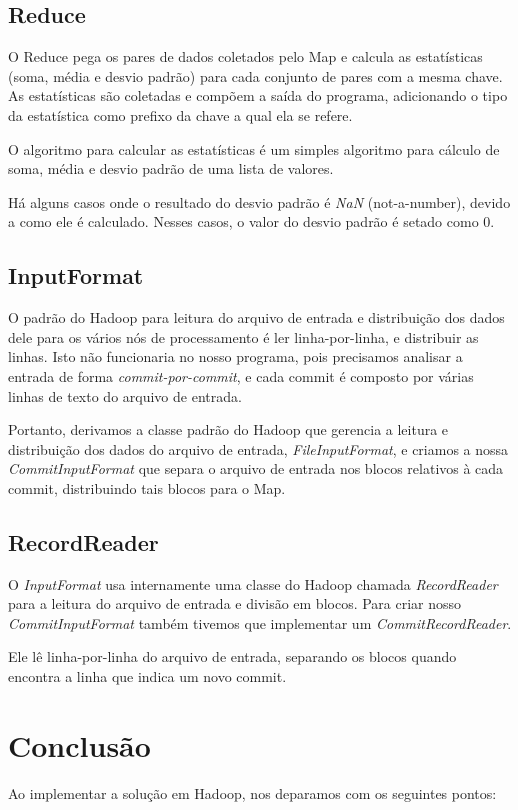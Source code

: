 \subsection{Reduce}
O Reduce pega os pares de dados coletados pelo Map e calcula as estatísticas (soma, média e desvio
padrão) para cada conjunto de pares com a mesma chave. As estatísticas são coletadas e compõem
a saída do programa, adicionando o tipo da estatística como prefixo da chave a qual ela se refere. 

O algoritmo para calcular as estatísticas é um simples algoritmo para cálculo de soma, média e
desvio padrão de uma lista de valores.

Há alguns casos onde o resultado do desvio padrão é \textit{NaN} (not-a-number), devido a como ele
é calculado. Nesses casos, o valor do desvio padrão é setado como 0.

\subsection{InputFormat}
O padrão do Hadoop para leitura do arquivo de entrada e distribuição dos dados dele para os vários
nós de processamento é ler linha-por-linha, e distribuir as linhas. Isto não funcionaria no nosso
programa, pois precisamos analisar a entrada de forma \textit{commit-por-commit}, e cada commit
é composto por várias linhas de texto do arquivo de entrada.

Portanto, derivamos a classe padrão do Hadoop que gerencia a leitura e distribuição dos dados do
arquivo de entrada, \textit{FileInputFormat}, e criamos a nossa \textit{CommitInputFormat} que 
separa o arquivo de entrada nos blocos relativos à cada commit, distribuindo tais blocos para
o Map.

\subsection{RecordReader}
O \textit{InputFormat} usa internamente uma classe do Hadoop chamada \textit{RecordReader} para
a leitura do arquivo de entrada e divisão em blocos. Para criar nosso \textit{CommitInputFormat}
também tivemos que implementar um \textit{CommitRecordReader}.

Ele lê linha-por-linha do arquivo de entrada, separando os blocos quando encontra a linha que
indica um novo commit.


\section{Conclusão}
Ao implementar a solução em Hadoop, nos deparamos com os seguintes pontos:
